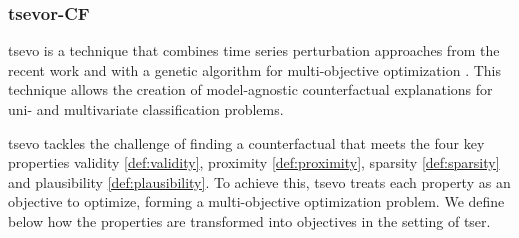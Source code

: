 \subsubsection{\gls{tsevor}-CF}
\label{sec:methods:tsevo}
\gls{tsevo} is a technique that combines time series perturbation approaches from the recent work\cite{guilleme_agnostic_2019} and \cite{mujkanovic_timexplain_2023} with a genetic algorithm for multi-objective optimization \cite{dandl_multi-objective_2020}. This technique allows the creation of model-agnostic counterfactual explanations for uni- and multivariate classification problems.

\gls{tsevo} tackles the challenge of finding a counterfactual that meets the four key properties validity \ref{def:validity}, proximity \ref{def:proximity}, sparsity \ref{def:sparsity} and plausibility \ref{def:plausibility}. To achieve this, \gls{tsevo} treats each property as an objective to optimize, forming a multi-objective optimization problem. We define below how the properties are transformed into objectives in the setting of \gls{tser}. 

